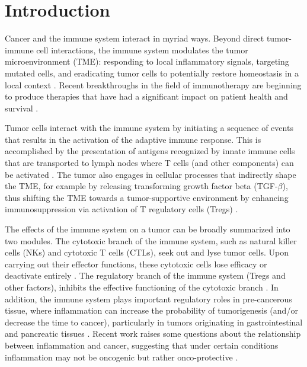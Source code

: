 \documentclass[11pt]{article}
\begin{document}


\section{Introduction}
Cancer and the immune system interact in myriad ways. Beyond direct tumor-immune cell interactions, the immune system modulates the tumor microenvironment (TME): responding to local inflammatory signals, targeting mutated cells, and eradicating tumor cells to potentially restore homeostasis in a local context \cite{de2006paradoxical}. Recent breakthroughs in the field of immunotherapy are beginning to produce therapies that have had a significant impact on patient health and survival \cite{pardoll2012blockade,restifo2012adoptive}.
\par 
Tumor cells interact with the immune system by initiating a sequence of events that results in the activation of the adaptive immune response. This is accomplished by the presentation of antigens recognized by innate immune cells that are transported to lymph nodes where T cells (and other components) can be activated \cite{schreiber11_cancer}. The tumor also engages in cellular processes that indirectly shape the TME, for example by releasing transforming growth factor beta (TGF-$\beta$), thus shifting the TME towards a tumor-supportive environment by enhancing immunosuppression via activation of T regulatory cells (Tregs) \cite{schreiber11_cancer}.
\par
The effects of the immune system on a tumor can be broadly summarized into two modules. The cytotoxic branch of the immune system, such as natural killer cells (NKs) and cytotoxic T cells (CTLs), seek out and lyse tumor cells.
Upon carrying out their effector functions, these cytotoxic cells lose efficacy or deactivate entirely \cite{finn12_immunooncology-1}. The regulatory branch of the immune system (Tregs and other factors), inhibits the effective functioning of the cytotoxic branch \cite{ruffell2010lymphocytes}.
In addition, the immune system plays important regulatory roles in pre-cancerous tissue, where inflammation can increase the probability of tumorigenesis (and/or decrease the time to cancer), particularly in tumors originating in gastrointestinal and pancreatic tissues \cite{hu10_inflammationinduced, balkwill01_inflammation}. Recent work raises some questions about the relationship between inflammation and cancer, suggesting that under certain conditions inflammation may not be oncogenic but rather onco-protective \cite{guo17_multiscale}. 
\end{document}
